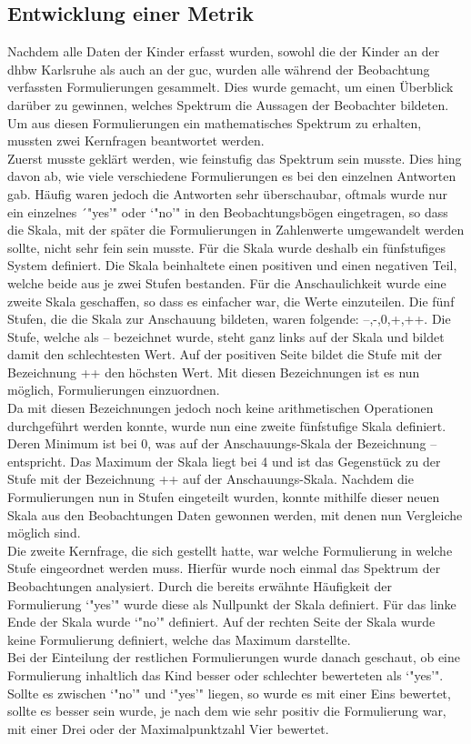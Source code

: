\subsection{Entwicklung einer Metrik}
Nachdem alle Daten der Kinder erfasst wurden, sowohl die der Kinder an der \acrshort{dhbw} Karlsruhe als auch an der \acrlong{guc}, wurden alle während der Beobachtung verfassten Formulierungen gesammelt. Dies wurde gemacht, um einen Überblick darüber zu gewinnen, welches Spektrum die Aussagen der Beobachter bildeten. Um aus diesen Formulierungen ein mathematisches Spektrum zu erhalten, mussten zwei Kernfragen beantwortet werden.\\
Zuerst musste geklärt werden, wie feinstufig das Spektrum sein musste. Dies hing davon ab, wie viele verschiedene Formulierungen es bei den einzelnen Antworten gab. Häufig waren jedoch die Antworten sehr überschaubar, oftmals wurde nur ein einzelnes ´"yes'" oder `"no'" in den Beobachtungsbögen eingetragen, so dass die Skala, mit der später die Formulierungen in Zahlenwerte umgewandelt werden sollte, nicht sehr fein sein musste. Für die Skala wurde deshalb ein fünfstufiges System definiert. Die Skala beinhaltete einen positiven und einen negativen Teil, welche beide aus je zwei Stufen bestanden. Für die Anschaulichkeit wurde eine zweite Skala geschaffen, so dass es einfacher war, die Werte einzuteilen. Die fünf Stufen, die die Skala zur Anschauung bildeten, waren folgende: --,-,0,+,++. Die Stufe, welche als -- bezeichnet wurde, steht ganz links auf der Skala und bildet damit den schlechtesten Wert. Auf der positiven Seite bildet die Stufe mit der Bezeichnung ++ den höchsten Wert. Mit diesen Bezeichnungen ist es nun möglich, Formulierungen einzuordnen.\\
Da mit diesen Bezeichnungen jedoch noch keine arithmetischen Operationen durchgeführt werden konnte, wurde nun eine zweite fünfstufige Skala definiert. Deren Minimum ist bei 0, was auf der Anschauungs-Skala der Bezeichnung -- entspricht. Das Maximum der Skala liegt bei 4 und ist das Gegenstück zu der Stufe mit der Bezeichnung ++ auf der Anschauungs-Skala. Nachdem die Formulierungen nun in Stufen eingeteilt wurden, konnte mithilfe dieser neuen Skala aus den Beobachtungen Daten gewonnen werden, mit denen nun Vergleiche möglich sind.\\

Die zweite Kernfrage, die sich gestellt hatte, war welche Formulierung in welche Stufe eingeordnet werden muss. Hierfür wurde noch einmal das Spektrum der Beobachtungen analysiert. Durch die bereits erwähnte Häufigkeit der Formulierung `"yes'" wurde diese als Nullpunkt der Skala definiert. Für das linke Ende der Skala wurde `"no'" definiert. Auf der rechten Seite der Skala wurde keine Formulierung definiert, welche das Maximum darstellte.\\
Bei der Einteilung der restlichen Formulierungen wurde danach geschaut, ob eine Formulierung inhaltlich das Kind besser oder schlechter bewerteten als `"yes'". Sollte es zwischen `"no'" und `"yes'" liegen, so wurde es mit einer Eins bewertet, sollte es besser sein wurde, je nach dem wie sehr positiv die Formulierung war, mit einer Drei oder der Maximalpunktzahl Vier bewertet.\\

